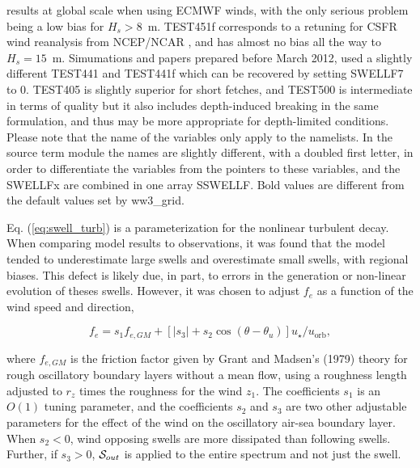 \begin{landscape}
\begin{table}
{results at global scale when using ECMWF winds, with the only serious problem being a low bias for $H_s > 8$~m. 
TEST451f corresponds to a retuning for CSFR wind reanalysis from NCEP/NCAR \citep{art:CFSR10}, and 
has almost no bias all the way to $H_s = 15$~m. Simumations and papers prepared before March 2012, 
used a slightly different TEST441 and TEST441f which can be recovered by setting SWELLF7 to 0. 
TEST405 
is slightly superior for short fetches, and TEST500 is intermediate in terms of quality 
but it also includes depth-induced breaking in the same formulation, 
and thus may be more appropriate for depth-limited conditions.
 Please
note that the name of the variables only apply to the namelists. In the source
term module the names are slightly different, with a doubled first letter, in
order to differentiate the variables from the pointers to these variables, and
the SWELLFx are combined in one array SSWELLF. Bold values are different from the 
default values set by ww3\_grid.} \label{tab:ST4_parSIN}
\end{table}
\end{landscape}



Eq. (\ref{eq:swell_turb}) is a parameterization for the
nonlinear turbulent decay. When comparing model results to observations, it
was found that the model tended to underestimate large swells and overestimate
small swells, with regional biases. This defect is likely due, in part, to
errors in the generation or non-linear evolution of theses swells. However, it
was chosen to adjust $f_e$ as a function of the wind speed and direction,

\begin{equation}
f_e = s_1 f_{e,GM} + \left[\left|s_3\right| + s_2 \cos
(\theta-\theta_u)\right]u_\star / u_{\mathrm{orb}},\label{fevar}
\end{equation}

\noindent
where $f_{e,GM}$ is the friction factor given by Grant and Madsen's
(1979)\nocite{art:GM79} theory for rough oscillatory boundary layers without a
mean flow, using a roughness length adjusted to $r_z$ times the roughness for
the wind $z_1$. The coefficients $s_1$ is an $O(1)$ tuning parameter, and the
coefficients $s_2$ and $s_3$ are two other adjustable parameters for the
effect of the wind on the oscillatory air-sea boundary layer. When $s_2 < 0$,
wind opposing swells are more dissipated than following swells. Further, if
$s_3 > 0$, ${\cal S}_{out}$ is applied to the entire spectrum and not just the
swell.

